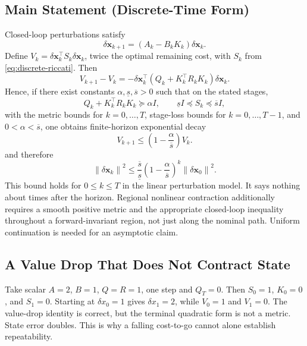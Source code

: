\documentclass[11pt,letterpaper]{article}
\newcommand{\norm}[1]{\left\lVert #1 \right\rVert}
\newcommand{\dx}{\delta\mathbf{x}}
\begin{document}
\subsection{Main Statement (Discrete-Time Form)}
Closed-loop perturbations satisfy
\begin{equation}
\dx_{k+1} = (A_k-B_kK_k)\dx_k.
\label{eq:closed-loop-perturbation}
\end{equation}
Define $V_k = \dx_k^\top S_k\dx_k$, twice the optimal remaining cost, with $S_k$ from \eqref{eq:discrete-riccati}. Then
\begin{equation}
V_{k+1} - V_k
= -\dx_k^\top(Q_k + K_k^\top R_k K_k)\dx_k.
\label{eq:value-drop}
\end{equation}
Hence, if there exist constants $\alpha,\underline{s},\overline{s}>0$ such that on the stated stages,
\begin{equation}
Q_k + K_k^\top R_k K_k \succeq \alpha I,
\qquad
\underline{s}I \preceq S_k \preceq \overline{s}I,
\label{eq:duality-bounds}
\end{equation}
with the metric bounds for $k=0,\ldots,T$, stage-loss bounds for $k=0,\ldots,T-1$, and $0<\alpha<\overline{s}$, one obtains finite-horizon exponential decay
\begin{equation}
V_{k+1} \le \left(1-\frac{\alpha}{\overline{s}}\right)V_k.
\label{eq:discrete-exp-decay}
\end{equation}
and therefore
\begin{equation}
\norm{\dx_k}^2
\le
\frac{\overline{s}}{\underline{s}}
\left(1-\frac{\alpha}{\overline{s}}\right)^k
\norm{\dx_0}^2.
\label{eq:state-norm-decay}
\end{equation}
This bound holds for $0\leq k\leq T$ in the linear perturbation model. It says nothing about times after the horizon. Regional nonlinear contraction additionally requires a smooth positive metric and the appropriate closed-loop inequality throughout a forward-invariant region, not just along the nominal path. Uniform continuation is needed for an asymptotic claim.

\subsection{A Value Drop That Does Not Contract State}
Take scalar $A=2$, $B=1$, $Q=R=1$, one step and $Q_T=0$. Then $S_0=1$, $K_0=0$, and $S_1=0$. Starting at $\delta x_0=1$ gives $\delta x_1=2$, while $V_0=1$ and $V_1=0$. The value-drop identity is correct, but the terminal quadratic form is not a metric. State error doubles. This is why a falling cost-to-go cannot alone establish repeatability.
\end{document}
